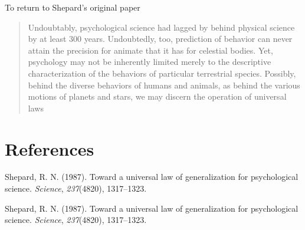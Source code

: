 \documentclass[doc]{apa6}
\begin{document}
To return to Shepard's original paper

\begin{quote}
Undoubtably, psychological science had lagged by behind physical science by at least 300 years. Undoubtedly, too, prediction of behavior can never attain the precision for animate that it has for celestial bodies. Yet, psychology may not be inherently limited merely to the descriptive characterization of the behaviors of particular terrestrial species. Possibly, behind the diverse behaviors of humans and animals, as behind the various motions of planets and stars, we may discern the operation of universal laws
\end{quote}

\hypertarget{references}{%
\section{References}\label{references}}

\begingroup
\setlength{\parindent}{-0.5in}
\setlength{\leftskip}{0.5in}

\hypertarget{refs}{}
\leavevmode\hypertarget{ref-shepard1987toward}{}%
Shepard, R. N. (1987). Toward a universal law of generalization for psychological science. \emph{Science}, \emph{237}(4820), 1317--1323.

\leavevmode\hypertarget{ref-shepard1987toward}{}%
Shepard, R. N. (1987). Toward a universal law of generalization for psychological science. \emph{Science}, \emph{237}(4820), 1317--1323.

\endgroup
\end{document}
